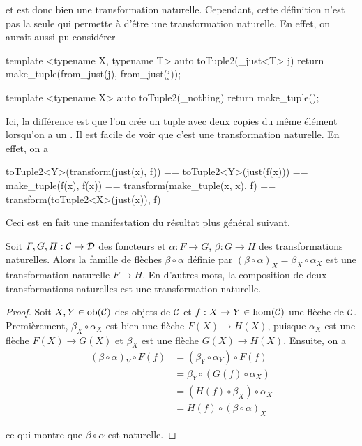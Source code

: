 et  est donc bien une transformation naturelle. Cependant, cette
définition n'est pas la seule qui permette à  d'être une
transformation naturelle. En effet, on aurait aussi pu considérer
\begin{cpp}
    template <typename X, typename T>
    auto toTuple2(_just<T> j) {
        return make_tuple(from_just(j), from_just(j));
    }

    template <typename X>
    auto toTuple2(_nothing) {
        return make_tuple();
    }
\end{cpp}

Ici, la différence est que l'on crée un tuple avec deux copies du même élément
lorsqu'on a un . Il est facile de voir que c'est une
transformation naturelle. En effet, on a
\begin{cpp}
    toTuple2<Y>(transform(just(x), f)) == toTuple2<Y>(just(f(x)))
                                       == make_tuple(f(x), f(x))
                                       == transform(make_tuple(x, x), f)
                                       == transform(toTuple2<X>(just(x)), f)
\end{cpp}

Ceci est en fait une manifestation du résultat plus général suivant.
\begin{théorème}
    Soit $F,G,H : \mathcal{C} \to \mathcal{D}$ des foncteurs et $\alpha : F \to G$, $\beta : G \to H$
    des transformations naturelles. Alors la famille de flèches $\beta \circ \alpha$
    définie par $(\beta \circ \alpha)_X = \beta_X \circ \alpha_X$ est une
    transformation naturelle $F \to H$. En d'autres mots, la composition de
    deux transformations naturelles est une transformation naturelle.
\end{théorème}
\begin{proof}
    Soit $X, Y \in \mathrm{ob}(\mathcal{C})$ des objets de $\mathcal{C}$ et $f : X \to Y \in \hom(\mathcal{C})$
    une flèche de $\mathcal{C}$. Premièrement, $\beta_X \circ \alpha_X$ est bien une
    flèche $F(X) \to H(X)$, puisque $\alpha_X$ est une flèche $F(X) \to G(X)$
    et $\beta_X$ est une flèche $G(X) \to H(X)$. Ensuite, on a
    \begin{align*}
        (\beta \circ \alpha)_Y \circ F(f)
            &= (\beta_Y \circ \alpha_Y) \circ F(f)                          \\
            &= \beta_Y \circ (G(f) \circ \alpha_X)                          \\
            &= (H(f) \circ \beta_X) \circ \alpha_X                          \\
            &= H(f) \circ (\beta \circ \alpha)_X
    \end{align*}

    ce qui montre que $\beta \circ \alpha$ est naturelle.
\end{proof}

